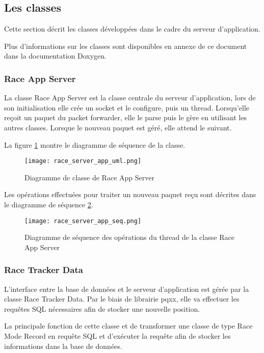 \subsection{Les classes}

Cette section décrit les classes développées dans le cadre du serveur d'application.

Plus d'informations sur les classes sont disponibles en annexe de ce document dans la documentation Doxygen.

\subsubsection{Race App Server}

La classe Race App Server est la classe centrale du serveur d'application, lors de son initialisation elle crée un socket et le configure, puis un thread. Lorsqu'elle reçoit un paquet du packet forwarder, elle le parse puis le gère en utilisant les autres classes. Lorsque le nouveau paquet est géré, elle attend le suivant.

La figure \ref{fig:race_app_server_uml} montre le diagramme de séquence de la classe.

\begin{figure}[htb]
\centering 
\texttt{[image: race\_server\_app\_uml.png]} 
\caption{Diagramme de classe de Race App Server}
\label{fig:race_app_server_uml}
\end{figure}

Les opérations effectuées pour traiter un nouveau paquet reçu sont décrites dans le diagramme de séquence \ref{fig:race_app_server_seq}.

\begin{figure}[htb]
\centering 
\texttt{[image: race\_server\_app\_seq.png]} 
\caption{Diagramme de séquence des opérations du thread de la classe Race App Server}
\label{fig:race_app_server_seq}
\end{figure}

\subsubsection{Race Tracker Data}

L'interface entre la base de données et le serveur d'application est gérée par la classe Race Tracker Data. Par le biais de librairie pqxx, elle va effectuer les requêtes SQL nécessaires afin de stocker une nouvelle position.

La principale fonction de cette classe et de transformer une classe de type Race Mode Record en requête SQL et d'exécuter la requête afin de stocker les informations dans la base de données.

